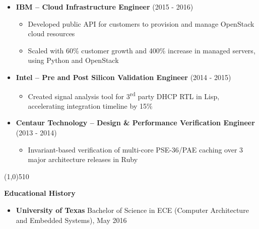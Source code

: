 \documentclass{report}
\newcommand{\cut}{\begin{center} \line(1,0){510} \end{center}}
\begin{document}
\begin{itemize}[label=]
\item \textbf{IBM -- Cloud Infrastructure Engineer} (2015 - 2016)
  \begin{itemize}[label=$\circ$]
  \item Developed public API for customers to provision and manage OpenStack cloud resources
  \item Scaled with 60\% customer growth and 400\% increase in managed servers, using Python and OpenStack
  \end{itemize}

\item \textbf{Intel -- Pre and Post Silicon Validation Engineer} (2014 - 2015)
  \begin{itemize}[label=$\circ$]
  \item Created signal analysis tool for 3\textsuperscript{rd} party DHCP RTL in Lisp, accelerating integration timeline by 15\%
  \end{itemize}

\item \textbf{Centaur Technology -- Design \& Performance Verification Engineer} (2013 - 2014)
  \begin{itemize}[label=$\circ$]
  \item Invariant-based verification of multi-core PSE-36/PAE caching over 3 major architecture releases in Ruby
  \end{itemize}

\end{itemize}

\cut{}

\textbf{Educational History}
\begin{itemize}[label=$\cdot$]
\item \textbf{University of Texas} Bachelor of Science in ECE (Computer Architecture and Embedded Systems), May 2016
\end{itemize}
\end{document}
